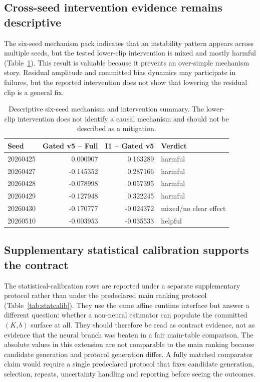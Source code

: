 \documentclass[11pt]{article}
\begin{document}
\subsection{Cross-seed intervention evidence remains descriptive}

The six-seed mechanism pack indicates that an instability pattern appears
across multiple seeds, but the tested lower-clip intervention is mixed and
mostly harmful (Table~\ref{tab:mechanism}).  This result is valuable because
it prevents an over-simple mechanism story.  Residual amplitude and committed
bias dynamics may participate in failures, but the reported intervention does
not show that lowering the residual clip is a general fix.

\begin{table}[t]
\centering
\small
\begin{tabular}{@{}lrrl@{}}
\toprule
Seed & Gated v5 -- Full & I1 -- Gated v5 & Verdict \\
\midrule
20260425 & 0.000907 & 0.163289 & harmful \\
20260427 & -0.145352 & 0.287166 & harmful \\
20260428 & -0.078998 & 0.057395 & harmful \\
20260429 & -0.127948 & 0.322245 & harmful \\
20260430 & -0.170777 & -0.024372 & mixed/no clear effect \\
20260510 & -0.003953 & -0.035533 & helpful \\
\bottomrule
\end{tabular}
\caption{Descriptive six-seed mechanism and intervention summary.  The
lower-clip intervention does not identify a causal mechanism and should not be
described as a mitigation.}
\label{tab:mechanism}
\end{table}

\subsection{Supplementary statistical calibration supports the contract}

The statistical-calibration rows are reported under a separate supplementary
protocol rather than under the predeclared main ranking protocol
(Table~\ref{tab:statcalib}).  They use the same affine runtime interface but
answer a different question: whether a non-neural estimator can populate the
committed \((K,b)\) surface at all.  They should therefore be read as
contract evidence, not as evidence that the neural branch was beaten in a fair
main-table comparison.  The absolute values in this extension are not
comparable to the main ranking because candidate generation and protocol
generation differ.  A fully matched comparator claim would require a single
predeclared protocol that fixes candidate generation, selection, repeats,
uncertainty handling and reporting before seeing the outcomes.
\end{document}
